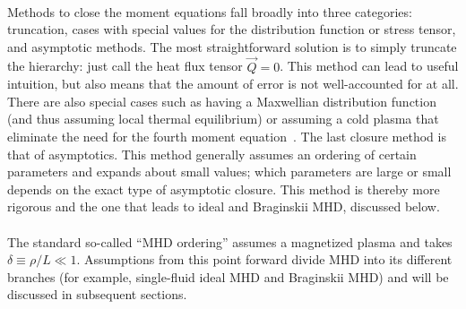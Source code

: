\\
Methods to close the moment equations fall broadly into three categories: truncation, cases with special values for the distribution function or stress tensor, and asymptotic methods. The most straightforward solution is to simply truncate the hierarchy: just call the heat flux tensor $\vec Q=0$. This method can lead to useful intuition, but also means that the amount of error is not well-accounted for at all. There are also special cases such as having a Maxwellian distribution function (and thus assuming local thermal equilibrium) or assuming a cold plasma that eliminate the need for the fourth moment equation~\cite{Hazeltine2004}. The last closure method is that of asymptotics. This method generally assumes an ordering of certain parameters and expands about small values; which parameters are large or small depends on the exact type of asymptotic closure. This method is thereby more rigorous and the one that leads to ideal and Braginskii MHD, discussed below. \\
\\
The standard so-called ``MHD ordering'' assumes a magnetized plasma and takes $\delta\equiv\rho/L\ll1$. Assumptions from this point forward divide MHD into its different branches (for example, single-fluid ideal MHD and Braginskii MHD) and will be discussed in subsequent sections.


